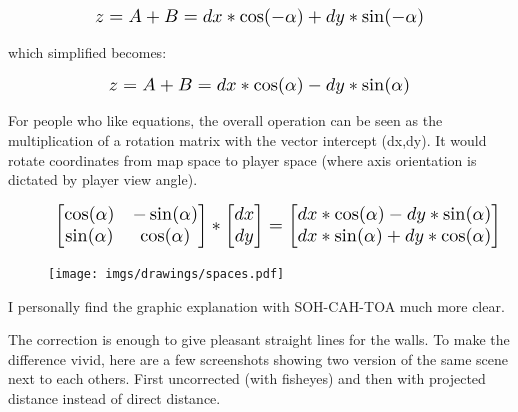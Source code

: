 \begin{figure}[H]
  \centering
  \begin{equation*}
    \scalebox{1.3}{
$z = A + B = dx * \cos(-\alpha) + dy * \sin(-\alpha) $ 
 }
  \end{equation*}
\end{figure}
which simplified becomes: 

\begin{figure}[H]
  \centering
  \begin{equation*}
    \scalebox{1.3}{
$z = A + B = dx * \cos(\alpha) - dy * \sin(\alpha) $
 }
  \end{equation*}
\end{figure}
\par
For people who like equations, the overall operation can be seen as the multiplication of a rotation matrix with the vector intercept (dx,dy). It would rotate coordinates from map space to player space (where axis orientation is dictated by player view angle).
\begin{figure}[H]
  \centering
  \begin{equation*}
    \scalebox{1.3}{
    $
      \begin{bmatrix} 
        \cos(\alpha) & -\sin(\alpha) \\ 
        \sin(\alpha) & \cos(\alpha) 
      \end{bmatrix} 
       *
      \begin{bmatrix} 
        dx \\ 
        dy 
      \end{bmatrix}
       =
      \begin{bmatrix} 
        dx*\cos(\alpha) - dy*\sin(\alpha) \\ 
        dx*\sin(\alpha) + dy*\cos(\alpha) 
      \end{bmatrix} 
      $
    }
  \end{equation*}
\end{figure}

\begin{figure}[H]
\centering
 \texttt{[image: imgs/drawings/spaces.pdf]}
 \end{figure}


I personally find the graphic explanation with SOH-CAH-TOA much more clear.\\
\par
The correction is enough to give pleasant straight lines for the walls. To make the difference vivid, here are a few screenshots showing two version of the same scene next to each others. First uncorrected (with fisheyes) and then with projected distance instead of direct distance.\\


